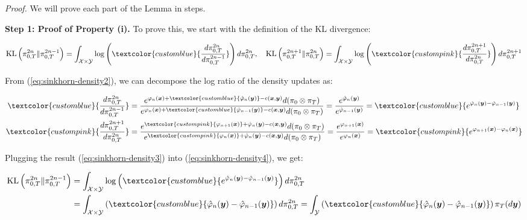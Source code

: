 \documentclass{article}
\newcommand{\bluetext}[1]{\textcolor{customblue}{#1}}
\newcommand{\pinktext}[1]{\textcolor{custompink}{#1}}
\begin{document}
\textit{Proof.} We will prove each part of the Lemma in steps.

\textbf{Step 1: Proof of Property (i). } 
To prove this, we start with the definition of the KL divergence:
\begin{small}
\begin{align}
    \text{KL}\left(\pi_{0,T}^{2n}\|\pi_{0,T}^{2n-1}\right)=\int_{\mathcal{X}\times\mathcal{Y}}\log \left(\bluetext{\frac{d\pi^{2n}_{0,T}}{d\pi^{2n-1}_{0,T}}}\right)d\pi^{2n}_{0,T}, \quad \text{KL}\left(\pi_{0,T}^{2n+1}\|\pi_{0,T}^{2n}\right)=\int_{\mathcal{X}\times\mathcal{Y}}\log \left(\pinktext{\frac{d\pi^{2n+1}_{0,T}}{d\pi^{2n}_{0,T}}}\right)d\pi^{2n+1}_{0,T}\label{eq:sinkhorn-density4}
\end{align}
\end{small}
From (\ref{eq:sinkhorn-density2}), we can decompose the log ratio of the density updates as:
\begin{small}
\begin{align}
    \bluetext{\frac{d\pi^{2n}_{0,T}}{d\pi^{2n-1}_{0,T}}}&=\frac{e^{\varphi_n(\boldsymbol{x})+\bluetext{\hat{\varphi}_{n}(\boldsymbol{y})}-c(\boldsymbol{x}, \boldsymbol{y})}d(\pi_0\otimes \pi_T)}{e^{\varphi_n(\boldsymbol{x})+\bluetext{\hat{\varphi}_{n-1}(\boldsymbol{y})}-c(\boldsymbol{x}, \boldsymbol{y})}d(\pi_0\otimes \pi_T)}=\frac{e^{\hat{\varphi}_n(\boldsymbol{y})}}{e^{\hat{\varphi}_{n-1}(\boldsymbol{y})}}=\bluetext{e^{\hat{\varphi}_n(\boldsymbol{y})-\hat{\varphi}_{n-1}(\boldsymbol{y})}}\label{eq:sinkhorn-density3}\\
    \pinktext{\frac{d\pi^{2n+1}_{0,T}}{d\pi^{2n}_{0,T}}}&=\frac{e^{\pinktext{\varphi_{n+1}(\boldsymbol{x})}+\hat{\varphi}_{n}(\boldsymbol{y})-c(\boldsymbol{x}, \boldsymbol{y})}d(\pi_0\otimes \pi_T)}{e^{\pinktext{\varphi_{n}(\boldsymbol{x})}+\hat{\varphi}_n(\boldsymbol{y})-c(\boldsymbol{x}, \boldsymbol{y})}d(\pi_0\otimes \pi_T)}=\frac{e^{\varphi_{n+1}(\boldsymbol{x})}}{e^{\varphi_{n}(\boldsymbol{x})}}=\pinktext{e^{\varphi_{n+1}(\boldsymbol{x})-\varphi_{n}(\boldsymbol{x})}}\label{eq:sinkhorn-density5}
\end{align}
\end{small}
Plugging the result (\ref{eq:sinkhorn-density3}) into (\ref{eq:sinkhorn-density4}), we get:
\begin{small}
\begin{align}
    \text{KL}\left(\pi_{0,T}^{2n}\|\pi_{0,T}^{2n-1}\right)&=\int_{\mathcal{X}\times\mathcal{Y}}\log \left(\bluetext{e^{\hat{\varphi}_n(\boldsymbol{y})-\hat{\varphi}_{n-1}(\boldsymbol{y})}}\right)d\pi^{2n}_{0,T}\nonumber\\
    &=\int_{\mathcal{X}\times\mathcal{Y}} \left(\bluetext{\hat{\varphi}_n(\boldsymbol{y})-\hat{\varphi}_{n-1}(\boldsymbol{y})}\right)d\pi^{2n}_{0,T}=\int_{\mathcal{Y}}\left(\bluetext{\hat{\varphi}_n(\boldsymbol{y})-\hat{\varphi}_{n-1}(\boldsymbol{y})}\right)\pi_T(d\boldsymbol{y}) \label{eq:sinkhorn-density6}
\end{align}
\end{small}
\end{document}
